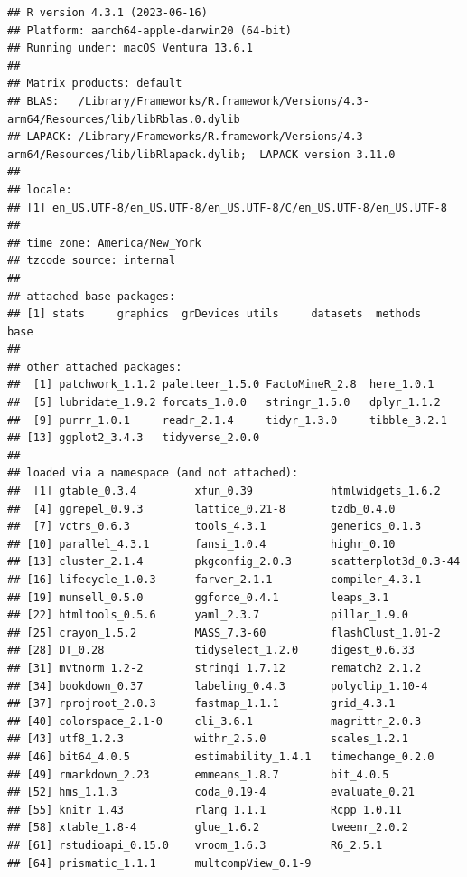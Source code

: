 \documentclass[
]{book}
\begin{document}
\begin{verbatim}
## R version 4.3.1 (2023-06-16)
## Platform: aarch64-apple-darwin20 (64-bit)
## Running under: macOS Ventura 13.6.1
## 
## Matrix products: default
## BLAS:   /Library/Frameworks/R.framework/Versions/4.3-arm64/Resources/lib/libRblas.0.dylib 
## LAPACK: /Library/Frameworks/R.framework/Versions/4.3-arm64/Resources/lib/libRlapack.dylib;  LAPACK version 3.11.0
## 
## locale:
## [1] en_US.UTF-8/en_US.UTF-8/en_US.UTF-8/C/en_US.UTF-8/en_US.UTF-8
## 
## time zone: America/New_York
## tzcode source: internal
## 
## attached base packages:
## [1] stats     graphics  grDevices utils     datasets  methods   base     
## 
## other attached packages:
##  [1] patchwork_1.1.2 paletteer_1.5.0 FactoMineR_2.8  here_1.0.1     
##  [5] lubridate_1.9.2 forcats_1.0.0   stringr_1.5.0   dplyr_1.1.2    
##  [9] purrr_1.0.1     readr_2.1.4     tidyr_1.3.0     tibble_3.2.1   
## [13] ggplot2_3.4.3   tidyverse_2.0.0
## 
## loaded via a namespace (and not attached):
##  [1] gtable_0.3.4         xfun_0.39            htmlwidgets_1.6.2   
##  [4] ggrepel_0.9.3        lattice_0.21-8       tzdb_0.4.0          
##  [7] vctrs_0.6.3          tools_4.3.1          generics_0.1.3      
## [10] parallel_4.3.1       fansi_1.0.4          highr_0.10          
## [13] cluster_2.1.4        pkgconfig_2.0.3      scatterplot3d_0.3-44
## [16] lifecycle_1.0.3      farver_2.1.1         compiler_4.3.1      
## [19] munsell_0.5.0        ggforce_0.4.1        leaps_3.1           
## [22] htmltools_0.5.6      yaml_2.3.7           pillar_1.9.0        
## [25] crayon_1.5.2         MASS_7.3-60          flashClust_1.01-2   
## [28] DT_0.28              tidyselect_1.2.0     digest_0.6.33       
## [31] mvtnorm_1.2-2        stringi_1.7.12       rematch2_2.1.2      
## [34] bookdown_0.37        labeling_0.4.3       polyclip_1.10-4     
## [37] rprojroot_2.0.3      fastmap_1.1.1        grid_4.3.1          
## [40] colorspace_2.1-0     cli_3.6.1            magrittr_2.0.3      
## [43] utf8_1.2.3           withr_2.5.0          scales_1.2.1        
## [46] bit64_4.0.5          estimability_1.4.1   timechange_0.2.0    
## [49] rmarkdown_2.23       emmeans_1.8.7        bit_4.0.5           
## [52] hms_1.1.3            coda_0.19-4          evaluate_0.21       
## [55] knitr_1.43           rlang_1.1.1          Rcpp_1.0.11         
## [58] xtable_1.8-4         glue_1.6.2           tweenr_2.0.2        
## [61] rstudioapi_0.15.0    vroom_1.6.3          R6_2.5.1            
## [64] prismatic_1.1.1      multcompView_0.1-9
\end{verbatim}
\end{document}
